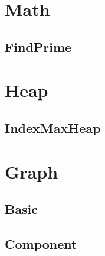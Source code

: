 \section{Math}
    \subsection{FindPrime}
        

\section{Heap}
    \subsection{IndexMaxHeap}
        

\section{Graph}
    \subsection{Basic}
        \subsection{Component}
            
